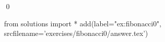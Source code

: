 
\begin{ex} 
  \label{ex:fibonacci0}
  
  \qed
\end{ex} 
\begin{python0}
from solutions import *
add(label="ex:fibonacci0",
    srcfilename='exercises/fibonacci0/answer.tex') 
\end{python0}

